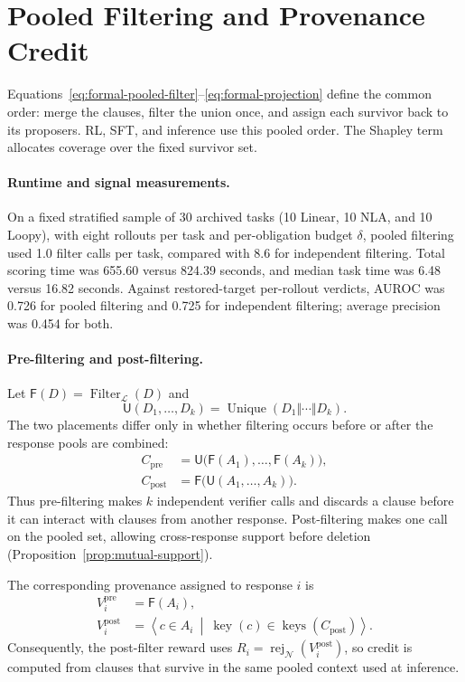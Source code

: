 \section{Pooled Filtering and Provenance Credit}
\label{app:houdini-order}

Equations~\eqref{eq:formal-pooled-filter}--\eqref{eq:formal-projection} define
the common order: merge the clauses, filter the union once, and assign each
survivor back to its proposers.  RL, SFT, and inference use this pooled order.
The Shapley term allocates coverage over the fixed survivor set.

\paragraph{Runtime and signal measurements.}
On a fixed stratified sample of 30 archived tasks (10 Linear, 10 NLA, and
10 Loopy), with eight rollouts per task and per-obligation budget \(\delta\),
pooled filtering used 1.0 filter calls per task, compared with 8.6 for
independent filtering.  Total scoring time was 655.60 versus 824.39 seconds,
and median task time was 6.48 versus 16.82 seconds.  Against restored-target
per-rollout verdicts, AUROC was 0.726 for pooled filtering and 0.725 for
independent filtering; average precision was 0.454 for both.

\paragraph{Pre-filtering and post-filtering.}
Let \(\mathsf F(D)=\operatorname{Filter}_{\mathcal L}(D)\) and
\[
  \mathsf U(D_1,\ldots,D_k)
  =\operatorname{Unique}(D_1\Vert\cdots\Vert D_k).
\]
The two placements differ only in whether filtering occurs before or after
the response pools are combined:
\begin{align}
  C_{\mathrm{pre}}
    &=\mathsf U\bigl(\mathsf F(A_1),\ldots,\mathsf F(A_k)\bigr),
    \label{eq:pre-filter-placement}\\
  C_{\mathrm{post}}
    &=\mathsf F\bigl(\mathsf U(A_1,\ldots,A_k)\bigr).
    \label{eq:post-filter-placement}
\end{align}
Thus pre-filtering makes \(k\) independent verifier calls and discards a
clause before it can interact with clauses from another response.
Post-filtering makes one call on the pooled set, allowing cross-response
support before deletion (Proposition~\ref{prop:mutual-support}).

The corresponding provenance assigned to response \(i\) is
\begin{align}
  V_i^{\mathrm{pre}}&=\mathsf F(A_i),\nonumber\\
  V_i^{\mathrm{post}}
    &=\left\langle c\in A_i\ \middle|\
      \operatorname{key}(c)\in\operatorname{keys}(C_{\mathrm{post}})
      \right\rangle.
  \label{eq:pre-post-provenance}
\end{align}
Consequently, the post-filter reward uses
\(R_i=\operatorname{rej}_{\mathcal N}(V_i^{\mathrm{post}})\), so credit is
computed from clauses that survive in the same pooled context used at
inference.

